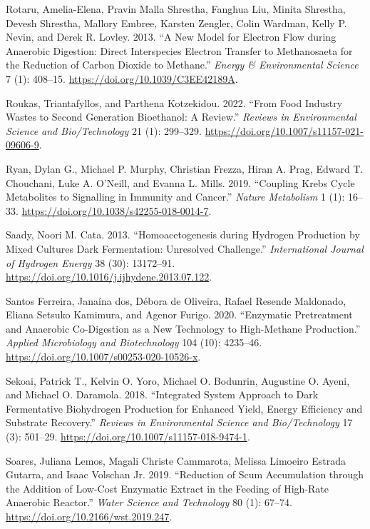 \documentclass[11pt]{report}
\begin{document}
\begin{hangparas}{1.5em}{1}
\hypertarget{citeproc_bib_item_54}{Rotaru, Amelia-Elena, Pravin Malla Shrestha, Fanghua Liu, Minita Shrestha, Devesh Shrestha, Mallory Embree, Karsten Zengler, Colin Wardman, Kelly P. Nevin, and Derek R. Lovley. 2013. “A New Model for Electron Flow during Anaerobic Digestion: Direct Interspecies Electron Transfer to Methanosaeta for the Reduction of Carbon Dioxide to Methane.” \textit{Energy \& Environmental Science} 7 (1): 408–15. \url{https://doi.org/10.1039/C3EE42189A}.}

\hypertarget{citeproc_bib_item_55}{Roukas, Triantafyllos, and Parthena Kotzekidou. 2022. “From Food Industry Wastes to Second Generation Bioethanol: A Review.” \textit{Reviews in Environmental Science and Bio/Technology} 21 (1): 299–329. \url{https://doi.org/10.1007/s11157-021-09606-9}.}

\hypertarget{citeproc_bib_item_56}{Ryan, Dylan G., Michael P. Murphy, Christian Frezza, Hiran A. Prag, Edward T. Chouchani, Luke A. O’Neill, and Evanna L. Mills. 2019. “Coupling Krebs Cycle Metabolites to Signalling in Immunity and Cancer.” \textit{Nature Metabolism} 1 (1): 16–33. \url{https://doi.org/10.1038/s42255-018-0014-7}.}

\hypertarget{citeproc_bib_item_57}{Saady, Noori M. Cata. 2013. “Homoacetogenesis during Hydrogen Production by Mixed Cultures Dark Fermentation: Unresolved Challenge.” \textit{International Journal of Hydrogen Energy} 38 (30): 13172–91. \url{https://doi.org/10.1016/j.ijhydene.2013.07.122}.}

\hypertarget{citeproc_bib_item_58}{Santos Ferreira, Janaína dos, Débora de Oliveira, Rafael Resende Maldonado, Eliana Setsuko Kamimura, and Agenor Furigo. 2020. “Enzymatic Pretreatment and Anaerobic Co-Digestion as a New Technology to High-Methane Production.” \textit{Applied Microbiology and Biotechnology} 104 (10): 4235–46. \url{https://doi.org/10.1007/s00253-020-10526-x}.}

\hypertarget{citeproc_bib_item_59}{Sekoai, Patrick T., Kelvin O. Yoro, Michael O. Bodunrin, Augustine O. Ayeni, and Michael O. Daramola. 2018. “Integrated System Approach to Dark Fermentative Biohydrogen Production for Enhanced Yield, Energy Efficiency and Substrate Recovery.” \textit{Reviews in Environmental Science and Bio/Technology} 17 (3): 501–29. \url{https://doi.org/10.1007/s11157-018-9474-1}.}

\hypertarget{citeproc_bib_item_60}{Soares, Juliana Lemos, Magali Christe Cammarota, Melissa Limoeiro Estrada Gutarra, and Isaac Volschan Jr. 2019. “Reduction of Scum Accumulation through the Addition of Low-Cost Enzymatic Extract in the Feeding of High-Rate Anaerobic Reactor.” \textit{Water Science and Technology} 80 (1): 67–74. \url{https://doi.org/10.2166/wst.2019.247}.}


\end{hangparas}
\end{document}
